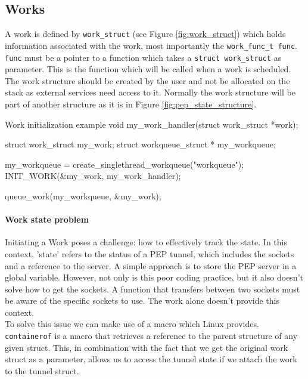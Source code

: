 \documentclass[a4paper,english, 11pt]{report}
\begin{document}
\subsection{Works}
A work is defined by \verb|work_struct| (see Figure \ref{fig:work_struct}) which holds information associated with the work, most importantly the \verb|work_func_t func|. \verb|func| must be a pointer to a function which takes a \verb|struct work_struct| as parameter. This is the function which will be called when a work is scheduled. The work structure should be created by the user and not be allocated on the stack as external services need access to it. Normally the work structure will be part of another structure as it is in Figure \ref{fig:pep_state_structure}.\\


\begin{autonumlstlisting}[label=lst:work_init]{Work initialization example}
void my_work_handler(struct work_struct *work);

struct work_struct my_work;
struct workqueue_struct * my_workqueue;

my_workqueue = create_singlethread_workqueue("workqueue");
INIT_WORK(&my_work, my_work_handler);

queue_work(my_workqueue, &my_work);
\end{autonumlstlisting}

\paragraph{Work state problem}
Initiating a Work poses a challenge: how to effectively track the state. In this context, 'state' refers to the status of a PEP tunnel, which includes the sockets and a reference to the server. A simple approach is to store the PEP server in a global variable. However, not only is this poor coding practice, but it also doesn't solve how to get the sockets. A function that transfers between two sockets must be aware of the specific sockets to use. The work alone doesn't provide this context.\\

To solve this issue we can make use of a macro which Linux provides. \verb|containerof| is a macro that retrieves a reference to the parent structure of any given struct. This, in combination with the fact that we get the original work struct as a parameter, allows us to access the tunnel state if we attach the work to the tunnel struct.\\
\end{document}
